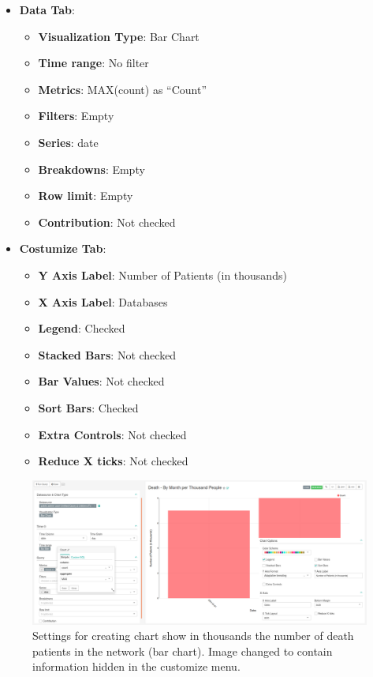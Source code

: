 \documentclass[]{book}
\providecommand{\tightlist}{%
  \setlength{\itemsep}{0pt}\setlength{\parskip}{0pt}}
\begin{document}
\begin{itemize}
\tightlist
\item
  \textbf{Data Tab}:

  \begin{itemize}
  \tightlist
  \item
    \textbf{Visualization Type}: Bar Chart
  \item
    \textbf{Time range}: No filter
  \item
    \textbf{Metrics}: MAX(count) as ``Count''
  \item
    \textbf{Filters}: Empty
  \item
    \textbf{Series}: date
  \item
    \textbf{Breakdowns}: Empty
  \item
    \textbf{Row limit}: Empty
  \item
    \textbf{Contribution}: Not checked
  \end{itemize}
\item
  \textbf{Costumize Tab}:

  \begin{itemize}
  \tightlist
  \item
    \textbf{Y Axis Label}: Number of Patients (in thousands)
  \item
    \textbf{X Axis Label}: Databases
  \item
    \textbf{Legend}: Checked
  \item
    \textbf{Stacked Bars}: Not checked
  \item
    \textbf{Bar Values}: Not checked
  \item
    \textbf{Sort Bars}: Checked
  \item
    \textbf{Extra Controls}: Not checked
  \item
    \textbf{Reduce X ticks}: Not checked
  \end{itemize}
\end{itemize}

\begin{figure}
\includegraphics[width=1\linewidth]{images/deathByMonthPerThousandPeople} \caption{Settings for creating chart show in thousands the number of death patients in the network (bar chart). Image changed to contain information hidden in the customize menu.}\label{fig:deathByMonthPerThousandPeople}
\end{figure}
\end{document}
